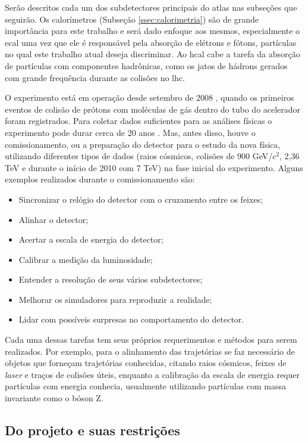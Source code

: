 Serão descritos cada um dos subdetectores principais do \gls{atlas} nas
subseções que seguirão. Os calorímetros (Subseção \ref{ssec:calorimetria}) são de grande importância 
para este trabalho e será dado enfoque aos mesmos, 
especialmente o \gls{ecal} uma vez que ele é responsável 
pela absorção de elétrons e fótons, partículas no qual este trabalho atual deseja
discriminar. Ao \gls{hcal} cabe a tarefa da absorção de partículas
com componentes hadrônicas, como os jatos de hádrons gerados com grande
frequência durante as colisões no \gls{lhc}.

O experimento está em operação desde setembro de 2008 \cite{webLHC},
quando os primeiros eventos de colisão de prótons com moléculas de gás dentro do tubo do acelerador
foram registrados. Para coletar dados suficientes para as análises físicas o
experimento pode durar cerca de 20 anos \cite{ATLAS_TDR}. Mas, antes disso, 
houve o comissionamento, ou a preparação do detector para o estudo da nova
física, utilizando diferentes tipos de dados (raios cósmicos, colisões de 900 GeV/$c^2$, 2,36
TeV e durante o início de 2010 com 7 TeV) na fase inicial do experimento. 
Alguns exemplos realizados durante o comissionamento são:

\begin{itemize}
\item Sincronizar o relógio do detector com o cruzamento entre os feixes;
\item Alinhar o detector;
\item Acertar a escala de energia do detector;
\item Calibrar a medição da luminosidade;
\item Entender a resolução de seus vários subdetectores;
\item Melhorar os simuladores para reproduzir a realidade;
\item Lidar com possíveis surpresas no comportamento do detector.
\end{itemize}

Cada uma dessas tarefas tem seus próprios requerimentos e métodos para serem
realizados. Por exemplo, para o alinhamento das trajetórias se faz necessário de
objetos que forneçam trajetórias conhecidas, citando raios cósmicos, feixes de \emph{laser} 
e traços de colisões úteis, enquanto a calibração da
escala de energia requer partículas com energia conhecia, usualmente
utilizando partículas com massa invariante como o bóson Z.

\subsection{Do projeto e suas restrições}
\label{ssec:atlas_restr}

